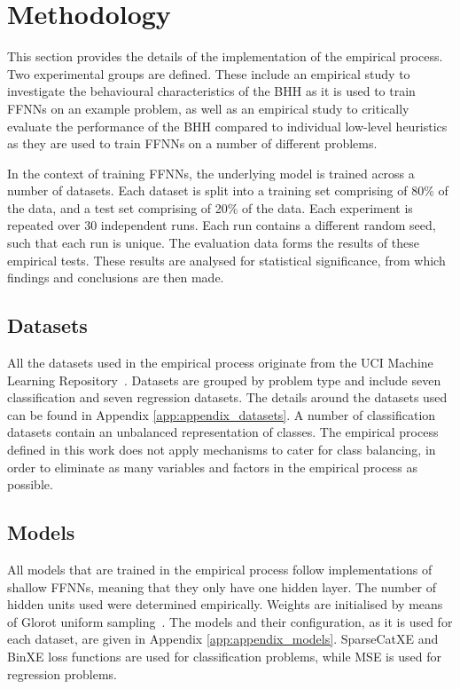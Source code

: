 \section{Methodology}
\label{sec:methodology}

This section provides the details of the implementation of the empirical process. Two experimental groups are defined. These include an empirical study to investigate the behavioural characteristics of the \Acs{BHH} as it is used to train \acp{FFNN} on an example problem, as well as an empirical study to critically evaluate the performance of the \Acs{BHH} compared to individual low-level heuristics as they are used to train \acp{FFNN} on a number of different problems.

In the context of training \acp{FFNN}, the underlying model is trained across a number of datasets. Each dataset is split into a training set comprising of 80\% of the data, and a test set comprising of 20\% of the data. Each experiment is repeated over 30 independent runs. Each run contains a different random seed, such that each run is unique. The evaluation data forms the results of these empirical tests. These results are analysed for statistical significance, from which findings and conclusions are then made.

\subsection{Datasets}\label{sec:methodology:datasets}

All the datasets used in the empirical process originate from the UCI Machine Learning Repository~\cite{ref:uci:2022}. Datasets are grouped by problem type and include seven classification and seven regression datasets. The details around the datasets used can be found in Appendix \ref{app:appendix_datasets}. A number of classification datasets contain an unbalanced representation of classes. The empirical process defined in this work does not apply mechanisms to cater for class balancing, in order to eliminate as many variables and factors in the empirical process as possible.

\subsection{Models}\label{sec:methodology:model}

All models that are trained in the empirical process follow implementations of shallow \acp{FFNN}, meaning that they only have one hidden layer. The number of hidden units used were determined empirically. Weights are initialised by means of Glorot uniform sampling~\cite{ref:glorot:2010}. The models and their configuration, as it is used for each dataset, are given in Appendix \ref{app:appendix_models}. \acf{SparseCatXE} and \acf{BinXE} loss functions are used for classification problems, while \acf{MSE} is used for regression problems.


